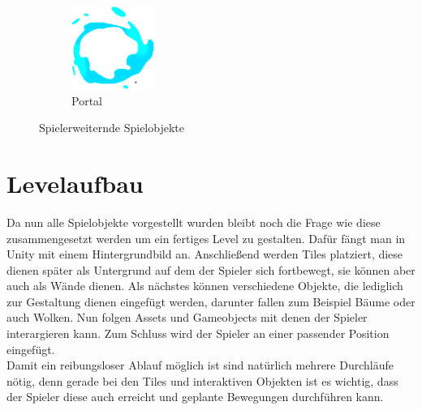 \begin{figure}[H]
\begin{subfigure}[H]{0.15\textwidth}
        \includegraphics[width=\textwidth]{img/realisierung/assets/portal}
        \caption{Portal}
        \label{fig:portal}
    \end{subfigure}
    \caption{Spielerweiternde Spielobjekte}
    \label{fig:barriereandportal}
\end{figure}

\section{Levelaufbau}
\label{sec:implementierung:levelaufbau}
Da nun alle Spielobjekte vorgestellt wurden bleibt noch die Frage wie diese zusammengesetzt werden um ein fertiges Level zu gestalten. Dafür fängt man in Unity mit einem Hintergrundbild an. Anschließend werden Tiles platziert, diese dienen später als Untergrund auf dem der Spieler sich fortbewegt, sie können aber auch als Wände dienen. Als nächstes können verschiedene Objekte, die lediglich zur Gestaltung dienen eingefügt werden, darunter fallen zum Beispiel Bäume oder auch Wolken. Nun folgen Assets und Gameobjects mit denen der Spieler interargieren kann. Zum Schluss wird der Spieler an einer passender Position eingefügt. \\
Damit ein reibungsloser Ablauf möglich ist sind natürlich mehrere Durchläufe nötig, denn gerade bei den Tiles und interaktiven Objekten ist es wichtig, dass der Spieler diese auch erreicht und geplante Bewegungen durchführen kann.

